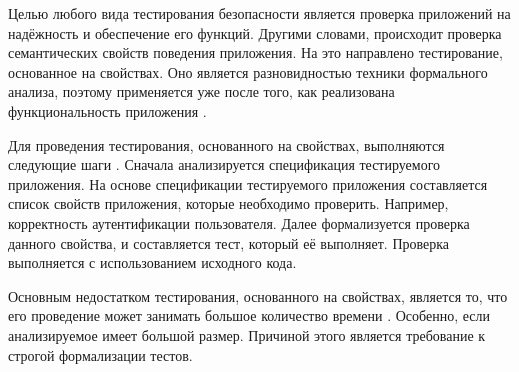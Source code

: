 %
Целью любого вида тестирования безопасности является проверка приложений на надёжность и обеспечение его функций. 
%
Другими словами, происходит проверка семантических свойств поведения приложения. 
%
На это направлено тестирование, основанное на свойствах. 
%
Оно является разновидностью техники формального анализа, поэтому применяется уже после того, как реализована функциональность приложения .

%
Для проведения тестирования, основанного на свойствах, выполняются следующие шаги 
. 
%
Сначала анализируется спецификация тестируемого приложения. 
%
На основе спецификации тестируемого приложения составляется список свойств приложения, которые необходимо проверить. 
%
Например, корректность аутентификации пользователя. 
%
Далее формализуется проверка данного свойства, и составляется тест, который её выполняет. 
%
Проверка выполняется с использованием исходного кода.

%
Основным недостатком тестирования, основанного на свойствах, является то, что его проведение может занимать большое количество времени . 
%
Особенно, если анализируемое  имеет большой размер. 
%
Причиной этого является требование к строгой формализации тестов.